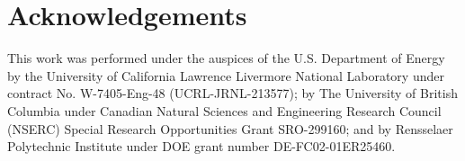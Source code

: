 \documentclass{aiaa-tc}
\begin{document}




\section*{Acknowledgements}

This work was performed under the auspices of the U.S. Department of
Energy by the University of California Lawrence Livermore National
Laboratory under contract No. W-7405-Eng-48 (UCRL-JRNL-213577); by The
University of British Columbia under Canadian Natural Sciences and
Engineering Research Council (NSERC) Special Research Opportunities
Grant SRO-299160; and by Rensselaer Polytechnic Institute under DOE
grant number DE-FC02-01ER25460.





\end{document}
